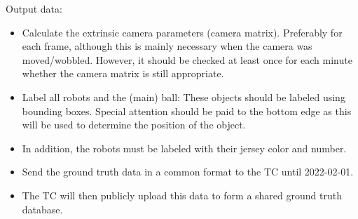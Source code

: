         Output data:
        \begin{itemize}
            \item Calculate the extrinsic camera parameters (camera matrix). Preferably for each frame, although this is mainly necessary when the camera was moved/wobbled. However, it should be checked at least once for each minute whether the camera matrix is still appropriate.
            \item Label all robots and the (main) ball: These objects should be labeled using bounding boxes. Special attention should be paid to the bottom edge as this will be used to determine the position of the object.
            \item In addition, the robots must be labeled with their jersey color and number.
            \item Send the ground truth data in a common format  to the TC until 2022-02-01.
            \item The TC will then publicly upload this data to form a shared ground truth database. 
        \end{itemize}